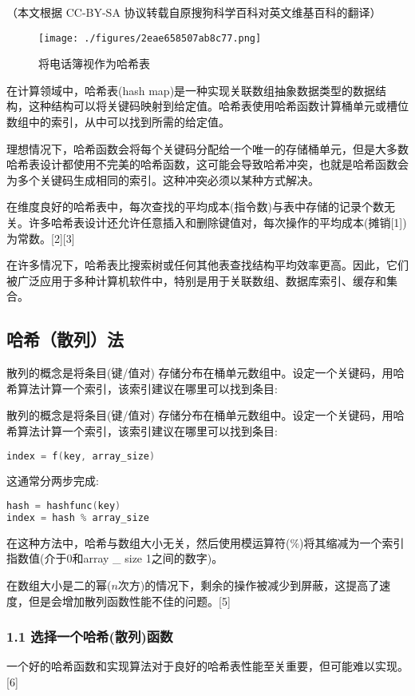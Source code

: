 
（本文根据 CC-BY-SA 协议转载自原搜狗科学百科对英文维基百科的翻译）

\begin{figure}[ht]
\centering
\texttt{[image: ./figures/2eae658507ab8c77.png]}
\caption{将电话簿视作为哈希表} \label{fig_HXB_5}
\end{figure}
在计算领域中，哈希表(hash map)是一种实现关联数组抽象数据类型的数据结构，这种结构可以将关键码映射到给定值。哈希表使用哈希函数计算桶单元或槽位数组中的索引，从中可以找到所需的给定值。

理想情况下，哈希函数会将每个关键码分配给一个唯一的存储桶单元，但是大多数哈希表设计都使用不完美的哈希函数，这可能会导致哈希冲突，也就是哈希函数会为多个关键码生成相同的索引。这种冲突必须以某种方式解决。

在维度良好的哈希表中，每次查找的平均成本(指令数)与表中存储的记录个数无关。许多哈希表设计还允许任意插入和删除键值对，每次操作的平均成本(摊销[1])为常数。[2][3]

在许多情况下，哈希表比搜索树或任何其他表查找结构平均效率更高。因此，它们被广泛应用于多种计算机软件中，特别是用于关联数组、数据库索引、缓存和集合。

\subsection{ 哈希（散列）法}
散列的概念是将条目(键/值对) 存储分布在桶单元数组中。设定一个关键码，用哈希算法计算一个索引，该索引建议在哪里可以找到条目:

散列的概念是将条目(键/值对) 存储分布在桶单元数组中。设定一个关键码，用哈希算法计算一个索引，该索引建议在哪里可以找到条目:
\begin{lstlisting}[language=cpp]
index = f(key, array_size)
\end{lstlisting}
这通常分两步完成:
\begin{lstlisting}[language=cpp]
hash = hashfunc(key)
index = hash % array_size
\end{lstlisting}
在这种方法中，哈希与数组大小无关，然后使用模运算符(\%)将其缩减为一个索引指数值(介于0和array _ size 1之间的数字)。

在数组大小是二的幂($n$次方)的情况下，剩余的操作被减少到屏蔽，这提高了速度，但是会增加散列函数性能不佳的问题。[5]

\subsubsection{1.1 选择一个哈希(散列)函数}
一个好的哈希函数和实现算法对于良好的哈希表性能至关重要，但可能难以实现。[6]

